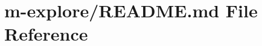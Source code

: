 \hypertarget{m-explore_2README_8md}{}\section{m-\/explore/\+R\+E\+A\+D\+ME.md File Reference}
\label{m-explore_2README_8md}

